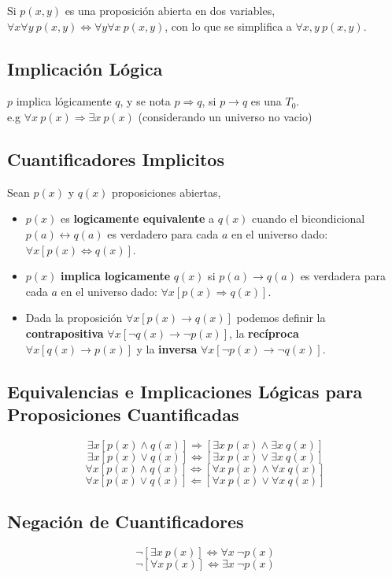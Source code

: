 \documentclass[11pt,a4paper]{article}
\begin{document}
\noindent Si $p(x,y)$ es una proposici\'on abierta en dos variables, $\forall x \forall y\ p(x,y) \Leftrightarrow \forall y \forall x\ p(x,y)$, con lo que se simplifica a $\forall x, y\ p(x,y)$.

\subsection{Implicaci\'on L\'ogica}
\noindent $p$ implica l\'ogicamente $q$, y se nota $p \Rightarrow q$, si $p \rightarrow q$ es una $T_0$.\\
\indent e.g $\forall x\ p(x) \Rightarrow \exists x\ p(x)$ (considerando un universo no vacio)

\subsection{Cuantificadores Implicitos}
\noindent Sean $p(x)$ y $q(x)$ proposiciones abiertas, 
\begin{itemize}
\item $p(x)$ es \textbf{logicamente equivalente} a $q(x)$ cuando el bicondicional $p(a) \leftrightarrow q(a)$ es verdadero para cada $a$ en el universo dado: $\forall x [p(x) \Leftrightarrow q(x)]$.
\item $p(x)$ \textbf{implica logicamente} $q(x)$ si $p(a) \rightarrow q(a)$ es verdadera para cada $a$ en el universo dado: $\forall x [p(x)\Rightarrow q(x)]$.
\item Dada la proposici\'on $\forall x [p(x) \rightarrow q(x)]$ podemos definir la \textbf{contrapositiva} $\forall x [\lnot q(x) \rightarrow \lnot p(x)]$, la \textbf{rec\'iproca} $\forall x [q(x) \rightarrow p(x)]$ y la \textbf{inversa} $\forall x [\lnot p(x) \rightarrow \lnot q(x)]$.
\end{itemize}

\subsection{Equivalencias e Implicaciones L\'ogicas para Proposiciones Cuantificadas}
$$\exists x [p(x) \land q(x)] \Rightarrow [\exists x\ p(x) \land \exists x\ q(x)]$$
$$\exists x [p(x) \lor q(x)] \Leftrightarrow [\exists x\ p(x) \lor \exists x\ q(x)]$$
$$\forall x [p(x) \land q(x)] \Leftrightarrow [\forall x\ p(x) \land \forall x\ q(x)]$$
$$\forall x [p(x) \lor q(x)] \Leftarrow [\forall x\ p(x) \lor \forall x\ q(x)]$$

\subsection{Negaci\'on de Cuantificadores}
$$\lnot[\exists x\ p(x)] \Leftrightarrow \forall x\ \lnot p(x)$$
$$\lnot[\forall x\ p(x)] \Leftrightarrow \exists x\ \lnot p(x)$$
\end{document}
